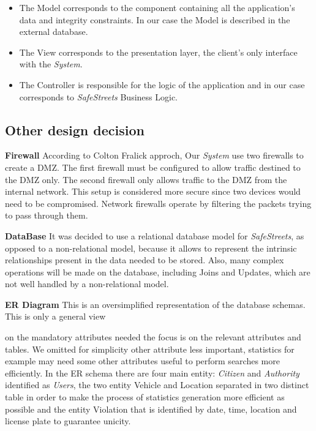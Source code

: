 \documentclass{article}
\begin{document}
\begin{itemize}
    \item The Model corresponds to the component containing all the application's data and integrity constraints. 
    In our case the Model is described in the external database.
    \item The View corresponds to the presentation layer, the client's only interface with the \textit{System}.
    \item The Controller is responsible for the logic of the application and in our case corresponds to \textit{SafeStreets}
    Business Logic.
\end{itemize}
\clearpage

\subsection{Other design decision}
\textbf{Firewall}
According to Colton Fralick approch, Our \textit{System} use two firewalls to create a DMZ. The first 
firewall must be configured to allow traffic destined to the DMZ only. The second firewall only 
allows traffic to the DMZ from the internal network. This setup is considered more secure since two 
devices would need to be compromised. Network firewalls operate by filtering the packets trying to 
pass through them.

\textbf{DataBase}
It was decided to use a relational database model for \textit{SafeStreets}, as opposed to a 
non-relational model, because it allows to represent the intrinsic relationships present in 
the data needed to be stored. Also, many complex operations will be made on the database, 
including Joins and Updates, which are not well handled by a non-relational model.

\textbf{ER Diagram}
This is an oversimplified representation of the database schemas. This is only a general view 

on the mandatory attributes needed the focus is on the relevant attributes and tables. We omitted 
for simplicity other attribute less important, statistics for example may need some other attributes 
useful to perform searches more efficiently. In the ER schema there are four main entity:  
\textit{Citizen} and \textit{Authority} identified as \textit{Users}, the two entity Vehicle and 
Location separated in two distinct table in order to make the process of statistics generation more 
efficient as possible and the entity Violation that is identified by date, time, location and license 
plate to guarantee unicity. 
\end{document}
